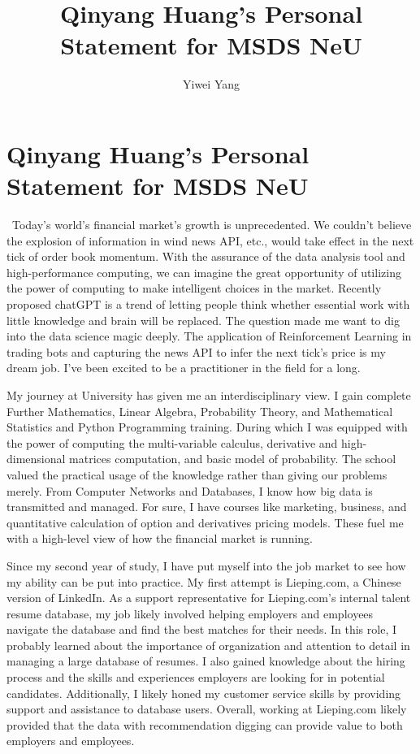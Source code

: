 \documentclass[a4paper,english]{article}
\title{Qinyang Huang's Personal Statement for MSDS NeU}
\author{Yiwei Yang}
\def\centersec#1{\centering#1} %
\begin{document}
\section*{\centersec{Qinyang Huang's Personal Statement for MSDS NeU}}
\quad\ Today's world's financial market's growth is unprecedented. We couldn't believe the explosion of information in wind news API, etc., would take effect in the next tick of order book momentum. With the assurance of the data analysis tool and high-performance computing, we can imagine the great opportunity of utilizing the power of computing to make intelligent choices in the market. Recently proposed chatGPT is a trend of letting people think whether essential work with little knowledge and brain will be replaced. The question made me want to dig into the data science magic deeply. The application of Reinforcement Learning in trading bots and capturing the news API to infer the next tick's price is my dream job. I've been excited to be a practitioner in the field for a long.

My journey at University has given me an interdisciplinary view. I gain complete Further Mathematics, Linear Algebra, Probability Theory, and Mathematical Statistics and Python Programming training. During which I was equipped with the power of computing the multi-variable calculus, derivative and high-dimensional matrices computation, and basic model of probability. The school valued the practical usage of the knowledge rather than giving our problems merely. From Computer Networks and Databases, I know how big data is transmitted and managed. For sure, I have courses like marketing, business, and quantitative calculation of option and derivatives pricing models. These fuel me with a high-level view of how the financial market is running.

Since my second year of study, I have put myself into the job market to see how my ability can be put into practice. My first attempt is Lieping.com, a Chinese version of LinkedIn. As a support representative for Lieping.com's internal talent resume database, my job likely involved helping employers and employees navigate the database and find the best matches for their needs. In this role, I probably learned about the importance of organization and attention to detail in managing a large database of resumes. I also gained knowledge about the hiring process and the skills and experiences employers are looking for in potential candidates. Additionally, I likely honed my customer service skills by providing support and assistance to database users. Overall, working at Lieping.com likely provided that the data with recommendation digging can provide value to both employers and employees.
\end{document}
